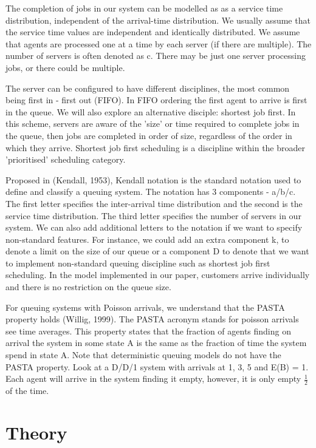 \documentclass{article}
\begin{document}
    The completion of jobs in our system can be modelled as as a service time distribution, independent of the arrival-time distribution. We usually assume that the service time values are independent and identically distributed. We assume that agents are processed one at a time by each server (if there are multiple). The number of servers is often denoted as c. There may be just one server processing jobs, or there could be multiple.

    The server can be configured to have different disciplines, the most common being first in - first out (FIFO). In FIFO ordering the first agent to arrive is first in the queue. We will also explore an alternative disciple: shortest job first. In this scheme, servers are aware of the 'size' or time required to complete jobs in the queue, then jobs are completed in order of size, regardless of the order in which they arrive. Shortest job first scheduling is a discipline within the broader 'prioritised' scheduling category.

    Proposed in (Kendall, 1953), Kendall notation is the standard notation used to define and classify a queuing system. The notation has 3 components - a/b/c. The first letter specifies the inter-arrival time distribution and the second is the service time distribution. The third letter specifies the number of servers in our system. We can also add additional letters to the notation if we want to specify non-standard features. For instance, we could add an extra component k, to denote a limit on the size of our queue or a component D to denote that we want to implement non-standard queuing discipline such as shortest job first scheduling. In the model implemented in our paper, customers arrive individually and there is no restriction on the queue size.

    For queuing systems with Poisson arrivals, we understand that the PASTA property holds (Willig, 1999). The PASTA acronym stands for poisson arrivals see time averages. This property states that the fraction of agents finding on arrival the system in some state A is the same as the fraction of time the system spend in state A. Note that deterministic queuing models do not have the PASTA property. Look at a D/D/1 system with arrivals at 1, 3, 5 and E(B) = 1. Each agent will arrive in the system finding it empty, however, it is only empty $\frac{1}{2}$ of the time.



    \newpage

    \section{Theory}
\end{document}
